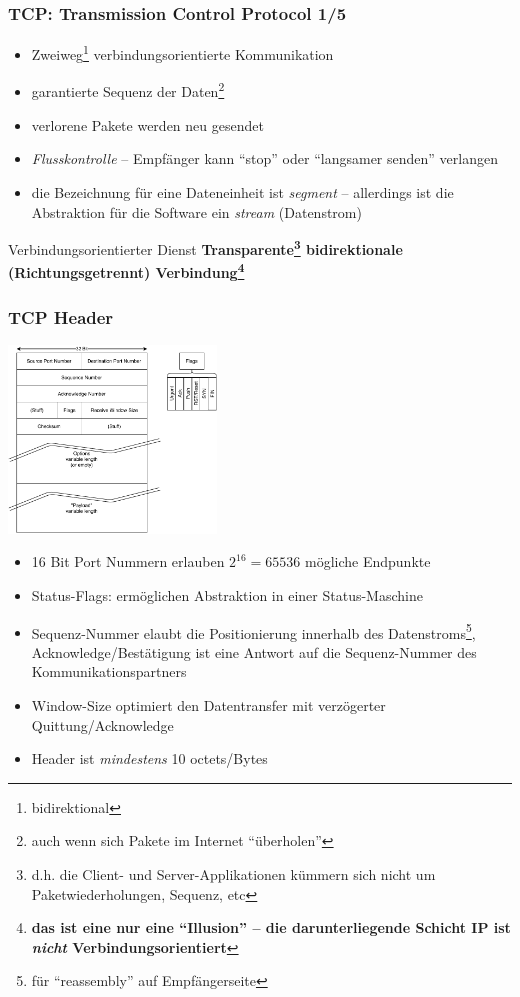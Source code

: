 \documentclass[ignorenonframetext]{beamer}
\begin{document}
\begin{frame}
\end{frame}



\begin{frame}
\frametitle{TCP: Transmission Control Protocol 1/5}
\begin{itemize}
	\item{Zweiweg\footnote{bidirektional} verbindungsorientierte Kommunikation}
	\item{garantierte Sequenz der Daten\footnote{auch wenn sich Pakete im Internet ``\"uberholen''}}
	\item{verlorene Pakete werden neu gesendet}
	\item{{\em Flusskontrolle} -- Empf\"anger kann ``stop'' oder ``langsamer senden'' verlangen}
	\item{die Bezeichnung f\"ur eine Dateneinheit ist {\em segment} -- allerdings ist die Abstraktion f\"ur die Software ein {\em stream} (Datenstrom)}
\end{itemize}
\begin{block}{Verbindungsorientierter Dienst}
\textbf{Transparente\footnote{d.h. die Client- und Server-Applikationen k\"ummern sich nicht um Paketwiederholungen, Sequenz, etc} bidirektionale (Richtungsgetrennt) Verbindung\footnote{\textbf{das ist eine nur eine ``Illusion'' -- die darunterliegende Schicht IP ist {\em nicht} Verbindungsorientiert}}}
\end{block}
\end{frame}

\begin{frame}
\frametitle{TCP Header}
\includegraphics[height=5cm]{tcp-header}
\begin{tiny}
\begin{itemize}
  \item 16 Bit Port Nummern erlauben $2^{16}=65536$ m\"ogliche Endpunkte
  \item Status-Flags: erm\"oglichen Abstraktion in einer Status-Maschine
  \item Sequenz-Nummer elaubt die Positionierung innerhalb des Datenstroms\footnote{f\"ur ``reassembly'' auf Empf\"angerseite}, Acknowledge/Best\"atigung ist eine Antwort auf die Sequenz-Nummer des Kommunikationspartners
  \item Window-Size optimiert den Datentransfer mit verz\"ogerter Quittung/Acknowledge
  \item Header ist {\em mindestens} 10 octets/Bytes
\end{itemize}
\end{tiny}
\end{frame}
\end{document}
